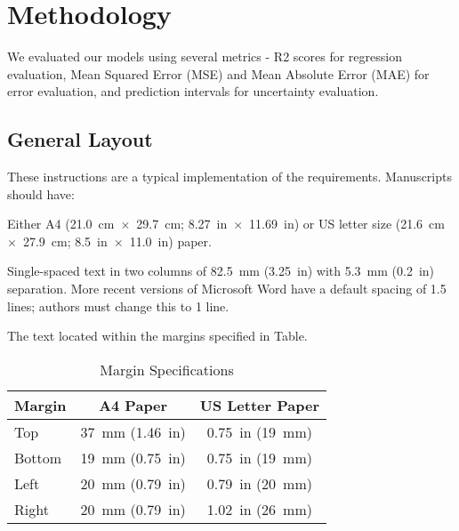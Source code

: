 \documentclass[a4paper,
               keeplastbox,   %
               ]{jacow}
\begin{document}
\section{Methodology}
We evaluated our models using several metrics - R2 scores for regression evaluation, Mean Squared Error (MSE) and Mean Absolute Error (MAE) for error evaluation, and prediction intervals for uncertainty evaluation.

\subsection{General Layout}

These instructions are a typical implementation of the
requirements. Manuscripts should have:
\begin{Itemize}
    \item  Either A4 (\SI{21.0}{cm}~$\times$~\SI{29.7}{cm}; \SI{8.27}{in}~$\times$~\SI{11.69}{in}) or US
           letter size (\SI{21.6}{cm}~$\times$~\SI{27.9}{cm}; \SI{8.5}{in}~$\times$~\SI{11.0}{in}) paper.
    \item  Single-spaced text in two columns of \SI{82.5}{mm} (\SI{3.25}{in}) with \SI{5.3}{mm}
           (\SI{0.2}{in}) separation. More recent versions of Microsoft Word have a default spacing of 1.5 lines;
           authors must change this to 1 line.
    \item  The text located within the margins specified in Table.
\end{Itemize}
\begin{table}[!hbt]
   \centering
   \caption{Margin Specifications}
   \begin{tabular}{lcc}
       \toprule
       \textbf{Margin} & \textbf{A4 Paper}                      & \textbf{US Letter Paper} \\
       \midrule
           Top         & \SI{37}{mm} (\SI{1.46}{in})            & \SI{0.75}{in} (\SI{19}{mm})        \\ %
          Bottom       & \SI{19}{mm} (\SI{0.75}{in})            & \SI{0.75}{in} (\SI{19}{mm})        \\ %
           Left        & \SI{20}{mm} (\SI{0.79}{in})            & \SI{0.79}{in} (\SI{20}{mm})        \\ %
           Right       & \SI{20}{mm} (\SI{0.79}{in})            & \SI{1.02}{in} (\SI{26}{mm})        \\
       \bottomrule
   \end{tabular}
   \label{tab:margins}
\end{table}
\end{document}
